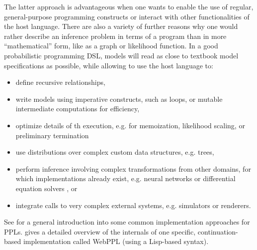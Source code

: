 The latter approach is advantageous when one wants to enable the use of regular, general-purpose
programming constructs or interact with other functionalities of the host language.  There are also
a variety of further reasons why one would rather describe an inference problem in terms of a
program than in more \enquote{mathematical} form, like as a graph or likelihood function.  In a good
probabilistic programming DSL, models will read as close to textbook model specifications as
possible, while allowing to use the host language to:
\begin{itemize}
  \firmlist
\item define recursive relationships,
\item write models using imperative constructs, such as loops, or mutable intermediate computations
  for efficiency,
\item optimize details of th execution, e.g. for memoization, likelihood scaling, or preliminary
  termination
\item use distributions over complex custom data structures, e.g. trees,
\item perform inference involving complex transformations from other domains, for which
  implementations already exist, e.g. neural networks or differential equation solvers , or
\item integrate calls to very complex external systems, e.g. simulators or renderers.
\end{itemize}
See \textcite{vandemeent2018introduction} for a general introduction into some common implementation
approaches for PPLs. \Textcite{goodman2014design} gives a detailed overview of the internals of one
specific, continuation-based implementation called WebPPL (using a Lisp-based syntax).

